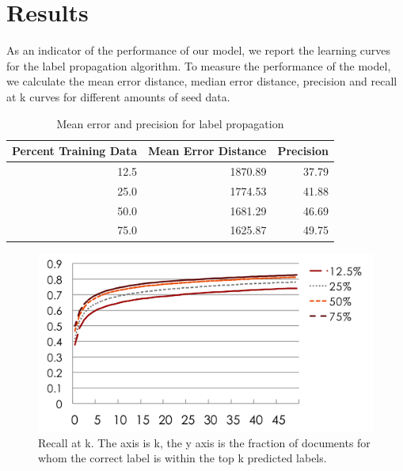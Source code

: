 
\section{Results} 

As an indicator of the performance of our model, we report the learning curves
for the label propagation algorithm.  To measure the performance of the model,
we calculate the mean error distance, median error distance, precision and
recall at k curves for different amounts of seed data. 

\begin{table}[tbp]
\begin{center}
\begin{tabular}{|r|r|r|}
\hline
Percent Training Data & Mean Error Distance & Precision \\
\hline
12.5 & 1870.89 & 37.79 \\
25.0 & 1774.53 & 41.88 \\
50.0 & 1681.29 & 46.69 \\
75.0 & 1625.87 & 49.75 \\
\hline
\end{tabular}
\caption{Mean error and precision for label propagation}
\label{tab:results}
\end{center}
\end{table}


\begin{figure}[tbp]
\begin{center}
\includegraphics[scale=0.7]{recall_at_k.png}
\caption{Recall at k. The axis is k, the y axis is the fraction of documents for whom the correct label is within the top k predicted labels.}
\label{fig:recall}
\end{center}
\end{figure}


